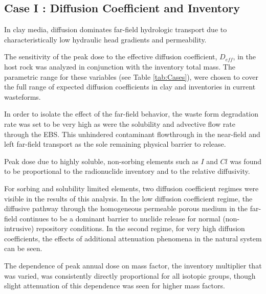 
\subsection{Case I : Diffusion Coefficient and Inventory }
\label{sec:diffusivity}

In clay media, diffusion dominates far-field hydrologic transport due to 
characteristically low hydraulic head gradients and permeability. 

The sensitivity of the peak dose to the effective diffusion coefficient, 
$D_{eff}$, in the host rock was analyzed in conjunction with the inventory 
total mass. The parametric range for these variables (see Table 
\ref{tab:Cases}), were chosen to cover the full range of expected diffusion 
coefficients in clay and inventories in current wasteforms.

In order to isolate the effect of the far-field behavior, the waste form 
degradation rate was set to be very high as were the solubility and advective 
flow rate through the  \gls{EBS}. This unhindered contaminant flowthrough 
in the near-field and left far-field transport as the sole remaining physical 
barrier to release.

Peak dose due to highly soluble, non-sorbing elements such as $I$ and $Cl$ 
was found to be proportional to the radionuclide inventory and 
to the relative diffusivity. 

For sorbing and solubility limited elements,
two diffusion coefficient regimes were visible in the results of this analysis. 
In the low diffusion coefficient regime, the diffusive pathway through the 
homogeneous permeable porous medium in the far-field continues to be a  dominant 
barrier to nuclide release for normal (non-intrusive) repository conditions.  
In the second regime, for very high diffusion coefficients, the effects of 
additional attenuation phenomena in the natural system can be seen. 

The dependence of peak annual dose on mass factor, the inventory multiplier that 
was varied, was consistently directly 
proportional for all isotopic groups, though slight attenuation of this 
dependence was seen for higher mass factors.
